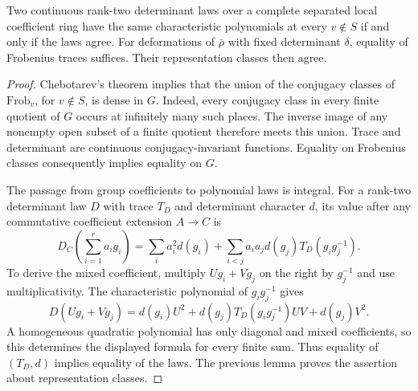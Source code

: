 \begin{lemma}
\label{v4-arith:w10-e:frobenius-law}
Two continuous rank-two determinant laws over a complete separated
local coefficient ring have the same characteristic polynomials at
every $v\notin S$ if and only if the laws agree.
For deformations of $\bar\rho$ with fixed determinant $\delta$,
equality of Frobenius traces suffices. Their representation classes
then agree.
\end{lemma}

\begin{proof}
Chebotarev's theorem implies that the union of the conjugacy classes
of $\mathrm{Frob}_v$, for $v\notin S$, is dense in $G$.
Indeed, every conjugacy class in every finite quotient of $G$ occurs
at infinitely many such places. The inverse image of any nonempty
open subset of a finite quotient therefore meets this union.
Trace and determinant are continuous conjugacy-invariant functions.
Equality on Frobenius classes consequently implies equality on $G$.

The passage from group coefficients to polynomial laws is integral.
For a rank-two determinant law $D$ with trace $T_D$ and determinant
character $d$, its value after any commutative coefficient extension
$A\to C$ is
\[
 D_C\left(\sum_{i=1}^r a_i g_i\right)
 =\sum_i a_i^2d(g_i)
  +\sum_{i<j}a_i a_jd(g_j)T_D(g_i g_j^{-1}).
\]
To derive the mixed coefficient, multiply $Ug_i+Vg_j$ on the right
by $g_j^{-1}$ and use multiplicativity. The characteristic polynomial
of $g_i g_j^{-1}$ gives
\[
 D(Ug_i+Vg_j)
 =d(g_i)U^2+d(g_j)T_D(g_i g_j^{-1})UV+d(g_j)V^2.
\]
A homogeneous quadratic polynomial has only diagonal and mixed
coefficients, so this determines the displayed formula for every
finite sum. Thus equality of $(T_D,d)$ implies equality of the laws.
The previous lemma proves the assertion about representation classes.
\end{proof}


